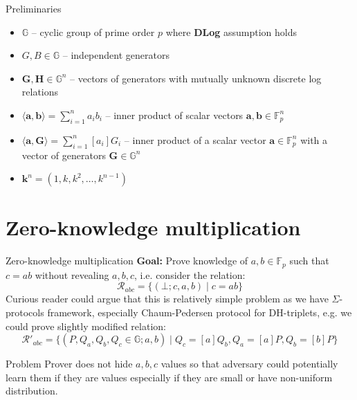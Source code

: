 \documentclass{zkdl-presentation-template}
\begin{document}
\begin{frame}{Preliminaries}
    \begin{itemize}
        \item $\mathbb{G}$ -- cyclic group of prime order $p$ where \textbf{DLog} assumption holds
        \item $G, B \in \mathbb{G}$ -- independent generators
        \item $\mathbf{G}, \mathbf{H} \in \mathbb{G}^n$ -- vectors of generators with mutually unknown discrete log relations
        \item $\langle \mathbf{a}, \mathbf{b} \rangle = \sum_{i=1}^n a_i b_i$ -- inner product of scalar vectors $\mathbf{a}, \mathbf{b} \in \mathbb{F}_p^n$
        \item $\langle \mathbf{a}, \mathbf{G} \rangle = \sum_{i=1}^n [a_i] G_i$ -- inner product of a scalar vector $\mathbf{a} \in \mathbb{F}_p^n$ with a vector of generators $\mathbf{G} \in \mathbb{G}^n$
        \item $\mathbf{k}^n = (1, k, k^2, \dots, k^{n-1})$
    \end{itemize}
\end{frame}


\section{Zero-knowledge multiplication}

\begin{frame}{Zero-knowledge multiplication}
    \textbf{Goal:} Prove knowledge of $a, b \in \mathbb{F}_p$ such that $c = ab$ without revealing $a, b, c$, i.e. consider the relation:
    $$\mathcal{R}_{abc} = \{ (\bot;c,a,b) \mid c=ab \}$$
    Curious reader could argue that this is relatively simple problem as we have $\Sigma$-protocols framework, especially Chaum-Pedersen protocol for DH-triplets, e.g. we could prove slightly modified relation:
    $$\mathcal{R}'_{abc} = \{ (P, Q_a, Q_b, Q_c \in \mathbb{G};a,b) \mid Q_c = [a]Q_b, Q_a = [a]P, Q_b = [b]P \}$$
    
    \begin{alertblock}{Problem}
        Prover does not hide $a,b,c$ values so that adversary could potentially learn them if they are values especially if they are small or have non-uniform distribution.
    \end{alertblock}
\end{frame}
\end{document}
